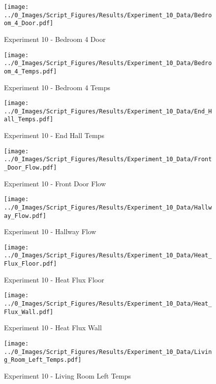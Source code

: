 	\begin{figure}[H]
		\centering
		\texttt{[image: ../0\_Images/Script\_Figures/Results/Experiment\_10\_Data/Bedroom\_4\_Door.pdf]}
		\caption[]{Experiment 10 - Bedroom 4 Door}
	\end{figure}
 
	\clearpage

	\begin{figure}[H]
		\centering
		\texttt{[image: ../0\_Images/Script\_Figures/Results/Experiment\_10\_Data/Bedroom\_4\_Temps.pdf]}
		\caption[]{Experiment 10 - Bedroom 4 Temps}
	\end{figure}
 

	\begin{figure}[H]
		\centering
		\texttt{[image: ../0\_Images/Script\_Figures/Results/Experiment\_10\_Data/End\_Hall\_Temps.pdf]}
		\caption[]{Experiment 10 - End Hall Temps}
	\end{figure}
 
	\clearpage

	\begin{figure}[H]
		\centering
		\texttt{[image: ../0\_Images/Script\_Figures/Results/Experiment\_10\_Data/Front\_Door\_Flow.pdf]}
		\caption[]{Experiment 10 - Front Door Flow}
	\end{figure}
 

	\begin{figure}[H]
		\centering
		\texttt{[image: ../0\_Images/Script\_Figures/Results/Experiment\_10\_Data/Hallway\_Flow.pdf]}
		\caption[]{Experiment 10 - Hallway Flow}
	\end{figure}
 
	\clearpage

	\begin{figure}[H]
		\centering
		\texttt{[image: ../0\_Images/Script\_Figures/Results/Experiment\_10\_Data/Heat\_Flux\_Floor.pdf]}
		\caption[]{Experiment 10 - Heat Flux Floor}
	\end{figure}
 

	\begin{figure}[H]
		\centering
		\texttt{[image: ../0\_Images/Script\_Figures/Results/Experiment\_10\_Data/Heat\_Flux\_Wall.pdf]}
		\caption[]{Experiment 10 - Heat Flux Wall}
	\end{figure}
 
	\clearpage

	\begin{figure}[H]
		\centering
		\texttt{[image: ../0\_Images/Script\_Figures/Results/Experiment\_10\_Data/Living\_Room\_Left\_Temps.pdf]}
		\caption[]{Experiment 10 - Living Room Left Temps}
	\end{figure}
 

